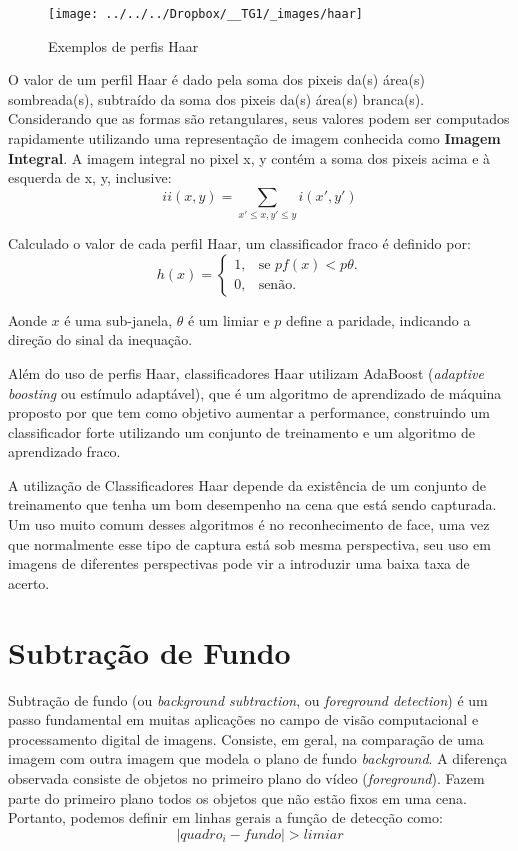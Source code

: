 \documentclass[ecp,tc]{iiufrgs}
\begin{document}
\begin{figure}
	\centering
	\caption{Exemplos de perfis Haar}
	\texttt{[image: ../../../Dropbox/\_\_TG1/\_images/haar]}
	\label{fig:haar}
\end{figure}

O valor de um perfil Haar é dado pela soma dos pixeis da(s) área(s) sombreada(s), subtraído da soma dos pixeis da(s) área(s) branca(s). Considerando que
as formas são retangulares, seus valores podem ser computados rapidamente utilizando uma representação de imagem conhecida como \textbf{Imagem Integral}.
A imagem integral no pixel x, y contém a soma dos pixeis acima e à esquerda de x, y, inclusive:
\[ ii(x,y) = \sum_{x'\le x,y' \le y} i(x', y') \]

Calculado o valor de cada perfil Haar, um classificador fraco é definido por:
\begin{equation}
	h(x)=\begin{cases}
		1, & \text{se $pf(x) < p\theta$}.\\
		0, & \text{senão}.
	\end{cases}
\end{equation}

Aonde $ x $ é uma sub-janela, $ \theta $ é um limiar e $ p $ define a paridade, indicando a direção do sinal da inequação.

Além do uso de perfis Haar, classificadores Haar utilizam AdaBoost (\textit{adaptive boosting} ou estímulo adaptável), que é um algoritmo de aprendizado de máquina proposto por  que tem como objetivo aumentar a performance, construindo um classificador forte utilizando um conjunto de treinamento e um algoritmo de aprendizado fraco.

A utilização de Classificadores Haar depende da existência de um conjunto de treinamento que tenha um bom desempenho na cena que está sendo capturada. Um uso muito comum desses algoritmos é no reconhecimento de face, uma vez que normalmente esse tipo de captura está sob mesma perspectiva, seu uso em imagens de diferentes perspectivas pode vir a introduzir uma baixa taxa de acerto.

\section{Subtração de Fundo}
Subtração de fundo (ou \textit{background subtraction}, ou \textit{foreground detection}) é um passo fundamental em muitas aplicações no campo de visão computacional e processamento digital de imagens. Consiste, em geral, na comparação de uma imagem com outra imagem que modela o plano de fundo \textit{background}.  A diferença observada consiste de objetos no primeiro plano do vídeo (\textit{foreground}). Fazem parte do primeiro plano todos os objetos que não estão fixos em uma cena. Portanto, podemos definir em linhas gerais a função de detecção como: 
\[ |quadro_i - fundo| > limiar \]
\end{document}
